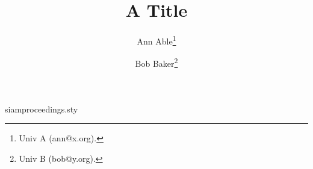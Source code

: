 \begin{filecontents*}[overwrite]{siamproceedings.sty}
\if@titlepage
  \renewcommand\maketitle{\begin{titlepage}%
  \let\footnotesize\small
  \let\footnoterule\relax
  \let \footnote \thanks
  \begin{center}{\LARGE \@title \par}\vskip 3em{\large\begin{tabular}[t]{c}\@author\end{tabular}\par}\end{center}\par
  \@thanks
  \end{titlepage}%
  \setcounter{footnote}{0}%
  \global\let\thanks\relax
  \global\let\maketitle\relax}
\else
\renewcommand\maketitle{\par
  \begingroup
    \renewcommand\thefootnote{\@fnsymbol\c@footnote}%
    \def\@makefnmark{\rlap{\@textsuperscript{\normalfont\@thefnmark}}}%
    \newpage
    \global\@topnum\z@
    \@maketitle
    \thispagestyle{plain}\@thanks
  \endgroup
  \setcounter{footnote}{0}%
  \global\let\thanks\relax
  \global\let\maketitle\relax
  \global\let\@maketitle\relax}
\fi
\end{filecontents*}
\documentclass[twoside,leqno]{article}
\usepackage{siamproceedings}
\title{A Title}
\author{Ann Able\thanks{Univ A (ann@x.org).} \and Bob Baker\thanks{Univ B (bob@y.org).}}

\maketitle
Body.

